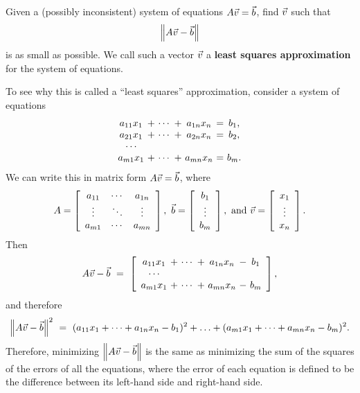 \documentclass{ximera}
\begin{document}
\begin{problem}\label{prob:least squares-approximation}

  Given a (possibly inconsistent) system of equations
  $A\vect{v}=\vect{b}$, find $\vect{v}$ such that
  \begin{equation*}
    \norm{A\vect{v} - \vect{b}}
  \end{equation*}
  is as small as possible. We call such a vector $\vect{v}$ a
  \textbf{least squares approximation}%
   for the system of equations.
\end{problem}

To see why this is called a ``least squares'' approximation, consider
a system of equations
\begin{equation*}
  \begin{array}{c@{~}c@{~}c@{~}c@{~}c@{~}c@{~}c}
    a_{11}x_1 &+& \cdots &+& a_{1n}x_n &=& b_1, \\
    a_{21}x_1 &+& \cdots &+& a_{2n}x_n &=& b_2, \\
    \cdots  \\
    a_{m1}x_1 &+& \cdots &+& a_{mn}x_n &=& b_m. \\
  \end{array}
\end{equation*}
We can write this in matrix form $A\vect{v}=\vect{b}$, where
\begin{equation*}
  A = \startmat{ccc}
    a_{11} & \cdots & a_{1n} \\
    \vdots & \ddots & \vdots \\
    a_{m1} & \cdots & a_{mn} \\
  \stopmat,
  \quad
  \vect{b} = \startmat{c} b_1 \\ \vdots \\ b_m \stopmat,
  \quad\mbox{and}\quad
  \vect{v} = \startmat{c} x_1 \\ \vdots \\ x_n \stopmat.
\end{equation*}
Then
\begin{equation*}
  A\vect{v} - \vect{b} ~=~
  \startmat{c@{~}c@{~}c@{~}c@{~}c@{~}c@{~}c}
    a_{11}x_1 &+& \cdots &+& a_{1n}x_n &-& b_1 \\
    \cdots \\
    a_{m1}x_1 &+& \cdots &+& a_{mn}x_n &-& b_m \\
  \stopmat,
\end{equation*}
and therefore
\begin{equation*}
  \norm{A\vect{v} - \vect{b}}^2 ~=~
  (a_{11}x_1 + \cdots + a_{1n}x_n - b_1)^2 + \ldots
  + (a_{m1}x_1 + \cdots + a_{mn}x_n - b_m)^2.
\end{equation*}
Therefore, minimizing $\norm{A\vect{v}-\vect{b}}$ is the same as
minimizing the sum of the squares of the errors of all the equations,
where the error of each equation is defined to be the difference
between its left-hand side and right-hand side.
\end{document}
